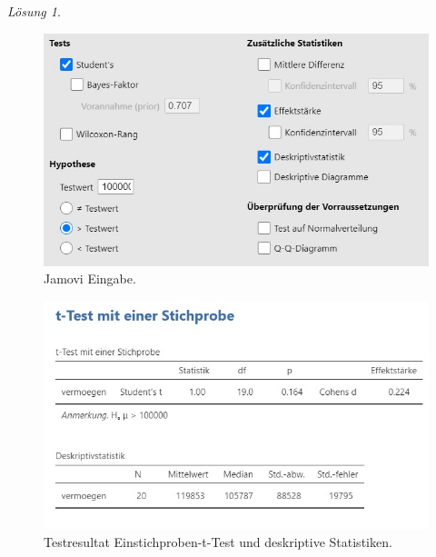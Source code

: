 \documentclass[
]{book}
\theoremstyle{definition}
\theoremstyle{definition}
\theoremstyle{definition}
\theoremstyle{definition}
\theoremstyle{remark}
\newtheorem*{solution}{Lösung}
\begin{document}
\begin{solution}
\leavevmode

\begin{figure}

{\centering \includegraphics[width=1\linewidth]{figures/05-exr-vermoegen-jmv-input} 

}

\caption{Jamovi Eingabe.}\label{fig:sol-vermoegen-input}
\end{figure}

\begin{figure}

{\centering \includegraphics[width=1\linewidth]{figures/05-exr-vermoegen-jmv-output} 

}

\caption{Testresultat Einstichproben-t-Test und deskriptive Statistiken.}\label{fig:sol-vermoegen-output}
\end{figure}

\end{solution}
\end{document}
